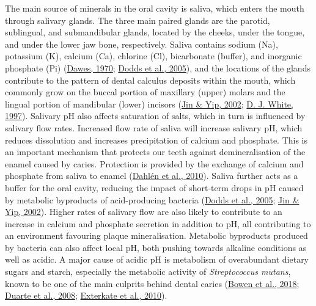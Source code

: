 \documentclass[
  letterpaper,
]{book}
\begin{document}
The main source of minerals in the oral cavity is saliva, which enters
the mouth through salivary glands. The three main paired glands are the
parotid, sublingual, and submandibular glands, located by the cheeks,
under the tongue, and under the lower jaw bone, respectively. Saliva
contains sodium (Na), potassium (K), calcium (Ca), chlorine (Cl),
bicarbonate (buffer), and inorganic phosphate (Pi)
(\protect\hyperlink{ref-dawesEffectsDiet1970}{Dawes, 1970};
\protect\hyperlink{ref-doddsHealthBenefits2005}{Dodds et al., 2005}),
and the locations of the glands contribute to the pattern of dental
calculus deposits within the mouth, which commonly grow on the buccal
portion of maxillary (upper) molars and the lingual portion of
mandibular (lower) incisors
(\protect\hyperlink{ref-jinSupragingivalCalculus2002}{Jin \& Yip, 2002};
\protect\hyperlink{ref-whiteDentalCalculus1997}{D. J. White, 1997}).
Salivary pH also affects saturation of salts, which in turn is
influenced by salivary flow rates. Increased flow rate of saliva will
increase salivary pH, which reduces dissolution and increases
precipitation of calcium and phosphate. This is an important mechanism
that protects our teeth against demineralisation of the enamel caused by
caries. Protection is provided by the exchange of calcium and phosphate
from saliva to enamel
(\protect\hyperlink{ref-dahlenMicrobiologicalStudy2010}{Dahlén et al.,
2010}). Saliva further acts as a buffer for the oral cavity, reducing
the impact of short-term drops in pH caused by metabolic byproducts of
acid-producing bacteria
(\protect\hyperlink{ref-doddsHealthBenefits2005}{Dodds et al., 2005};
\protect\hyperlink{ref-jinSupragingivalCalculus2002}{Jin \& Yip, 2002}).
Higher rates of salivary flow are also likely to contribute to an
increase in calcium and phosphate secretion in addition to pH, all
contributing to an environment favouring plaque mineralisation.
Metabolic byproducts produced by bacteria can also affect local pH, both
pushing towards alkaline conditions as well as acidic. A major cause of
acidic pH is metabolism of overabundant dietary sugars and starch,
especially the metabolic activity of \emph{Streptococcus mutans}, known
to be one of the main culprits behind dental caries
(\protect\hyperlink{ref-bowenOralBiofilms2018}{Bowen et al., 2018};
\protect\hyperlink{ref-duarteInfluencesStarch2008}{Duarte et al., 2008};
\protect\hyperlink{ref-extercateAAA2010}{Exterkate et al., 2010}).
\end{document}
